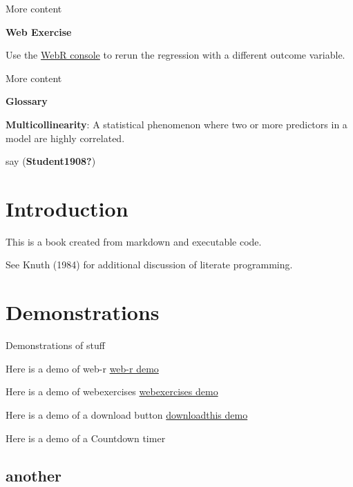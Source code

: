 \documentclass[
  letterpaper,
  DIV=11,
  numbers=noendperiod]{scrreprt}
\begin{document}
More content

\begin{gswebexercise}

\textbf{Web Exercise}

Use the \href{https://webr.r-wasm.org/}{WebR console} to rerun the
regression with a different outcome variable.

\end{gswebexercise}

More content

\begin{gsglossary}

\textbf{Glossary}

\textbf{Multicollinearity}: A statistical phenomenon where two or more
predictors in a model are highly correlated.

\end{gsglossary}

say (\textbf{Student1908?})


\chapter{Introduction}\label{introduction}

This is a book created from markdown and executable code.

See Knuth (1984) for additional discussion of literate programming.


\chapter{Demonstrations}\label{demonstrations}

Demonstrations of stuff

\hfill\break

Here is a demo of web-r \href{webr.qmd}{web-r demo}

Here is a demo of webexercises \href{webexercises.qmd}{webexercises
demo}

Here is a demo of a download button \href{downloadthis.qmd}{downloadthis
demo}

Here is a demo of a Countdown timer

\section{another}\label{another}
\end{document}
